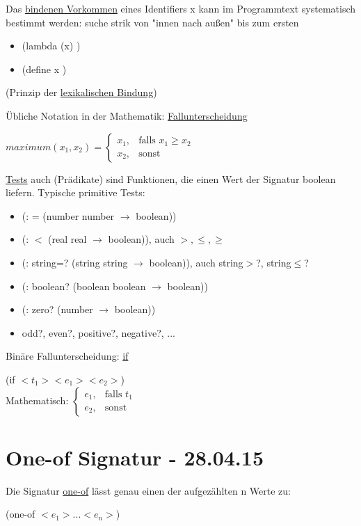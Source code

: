 \documentclass[a4paper, 20pt, openany]{book}
\begin{document}
Das \underline{bindenen Vorkommen} eines Identifiers x kann im Programmtext systematisch bestimmt werden: suche strik von "innen nach außen" bis zum ersten 

\begin{itemize}
\item (lambda (x) )
\item (define x )
\end{itemize}

(Prinzip der \underline{lexikalischen Bindung})

Übliche Notation in der Mathematik: \underline{Fallunterscheidung}

$ maximum(x_{1}, x_{2})=\left\{\begin{array}{cl} x_{1}, & \mbox{falls } x_{1} \geq x_{2}\\ x_{2}, & \mbox{sonst} \end{array}\right. $

\underline{Tests} auch (Prädikate) sind Funktionen, die einen Wert der Signatur boolean liefern. Typische primitive Tests:

\begin{itemize}
\item (: = (number number $\rightarrow$ boolean))
\item (: $<$ (real real $\rightarrow$ boolean)), auch $>, \le, \geq$
\item (: string=? (string string $\rightarrow$ boolean)), auch string$>$?, string$\le$?
\item (: boolean? (boolean boolean $\rightarrow$ boolean))
\item (: zero? (number $\rightarrow$ boolean))
\item odd?, even?, positive?, negative?, ...
\end{itemize}

Binäre Fallunterscheidung: \underline{if}

(if $<t_{1}> <e_{1}> <e_{2}>$) \\

Mathematisch: 
$ \left\{\begin{array}{cl} e_{1}, & \mbox{falls } t_{1}\\ e_{2}, & \mbox{sonst} \end{array}\right. $

\chapter{One-of Signatur - 28.04.15}
Die Signatur \underline{one-of} lässt genau einen der aufgezählten n Werte zu: 
\begin{center}
	(one-of $<e_1> ... <e_n>$)
\end{center}
\end{document}
